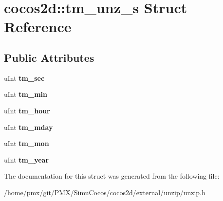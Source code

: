 \hypertarget{structcocos2d_1_1tm__unz__s}{}\section{cocos2d\+:\+:tm\+\_\+unz\+\_\+s Struct Reference}
\label{structcocos2d_1_1tm__unz__s}
\subsection*{Public Attributes}
\begin{DoxyCompactItemize}
\item 
\mbox{\label{structcocos2d_1_1tm__unz__s_a53760323b8b080ea302748f8abd027a5}} 
u\+Int {\bfseries tm\+\_\+sec}
\item 
\mbox{\label{structcocos2d_1_1tm__unz__s_a47cba0ccae91b26cdb30412bf1edd71c}} 
u\+Int {\bfseries tm\+\_\+min}
\item 
\mbox{\label{structcocos2d_1_1tm__unz__s_ab5e75fd2691e42f58186407f305388c0}} 
u\+Int {\bfseries tm\+\_\+hour}
\item 
\mbox{\label{structcocos2d_1_1tm__unz__s_a0495d8ec52d0be549897ac4a0363d252}} 
u\+Int {\bfseries tm\+\_\+mday}
\item 
\mbox{\label{structcocos2d_1_1tm__unz__s_a7c11cd4d8b368d8049ccf1926b867de0}} 
u\+Int {\bfseries tm\+\_\+mon}
\item 
\mbox{\label{structcocos2d_1_1tm__unz__s_afb7f61749f5383ec83c91fb1e8cee565}} 
u\+Int {\bfseries tm\+\_\+year}
\end{DoxyCompactItemize}


The documentation for this struct was generated from the following file\+:\begin{DoxyCompactItemize}
\item 
/home/pmx/git/\+P\+M\+X/\+Simu\+Cocos/cocos2d/external/unzip/unzip.\+h\end{DoxyCompactItemize}
